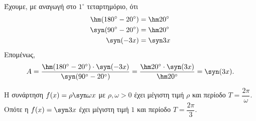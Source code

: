 \begin{alist}
\item Έχουμε, με αναγωγή στο $1^\circ$ τεταρτημόριο, ότι
\begin{align*}
\hm (180^\circ - 20^\circ) &= \hm  20^\circ \\
\syn (90^\circ - 20^\circ) &= \hm  20^\circ \\
\syn (-3x) &= \syn  3x
\end{align*}
Επομένως,
\[A = \frac{\hm (180^\circ - 20^\circ) \cdot \syn (-3x)}{\syn (90^\circ - 20^\circ)} = \frac{\hm  20^\circ \cdot \syn (3x)}{\hm  20^\circ} = \syn (3x).\]
\item Η συνάρτηση $f(x) = \rho\syn \omega x$ με $\rho, \omega > 0$ έχει μέγιστη τιμή $\rho$ και περίοδο $T = \dfrac{2\pi}{\omega}$. \\
Οπότε η $f(x) = \syn  3x$ έχει μέγιστη τιμή $1$ και περίοδο $T = \dfrac{2\pi}{3}$.
\end{alist}

